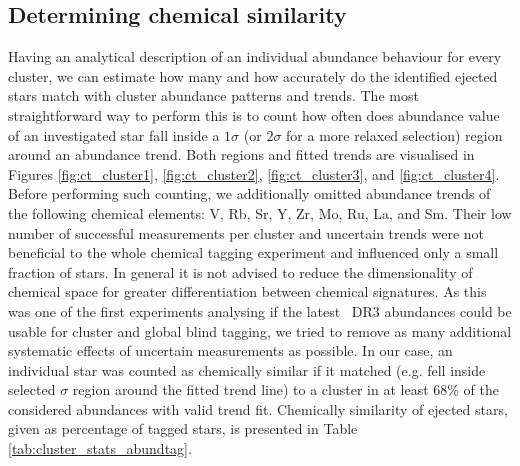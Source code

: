 \subsection{Determining chemical similarity}
\label{sec:chem_ej_tag}
Having an analytical description of an individual abundance behaviour for every cluster, we can estimate how many and how accurately do the identified ejected stars match with cluster abundance patterns and trends. The most straightforward way to perform this is to count how often does abundance value of an investigated star fall inside a $1\sigma$ (or $2\sigma$ for a more relaxed selection) region around an abundance trend. Both regions and fitted trends are visualised in Figures \ref{fig:ct_cluster1}, \ref{fig:ct_cluster2}, \ref{fig:ct_cluster3}, and \ref{fig:ct_cluster4}. Before performing such counting, we additionally omitted abundance trends of the following chemical elements: V, Rb, Sr, Y, Zr, Mo, Ru, La, and Sm. Their low number of successful measurements per cluster and uncertain trends were not beneficial to the whole chemical tagging experiment and influenced only a small fraction of stars. In general it is not advised to reduce the dimensionality of chemical space for greater differentiation between chemical signatures. As this was one of the first experiments analysing if the latest \Gh\ DR3 abundances could be usable for cluster and global blind tagging, we tried to remove as many additional systematic effects of uncertain measurements as possible. In our case, an individual star was counted as chemically similar if it matched (e.g. fell inside selected $\sigma$ region around the fitted trend line) to a cluster in at least $68$\% of the considered abundances with valid trend fit. Chemically similarity of ejected stars, given as percentage of tagged stars, is presented in Table \ref{tab:cluster_stats_abundtag}.


